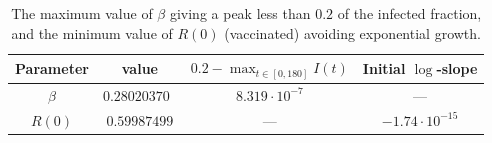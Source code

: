 \begin{table}[htb]
	\centering
	\caption{The maximum value of $\beta$ giving a peak less than $0.2$ of the infected fraction, and the minimum value of $R(0)$ (vaccinated) avoiding exponential growth.}
	\begin{tabular}{cccc}
		\toprule
		Parameter & value & $0.2 - \max_{t\in[0,180]} I(t)$ & Initial $\log$-slope \\
		\midrule
		$\beta$ & $0.28020370$ & $8.319\cdot 10^{-7}$ & --- \\
		$R(0)$  & $0.59987499$ & --- & $-1.74\cdot 10^{-15}$ \\
		\bottomrule
	\end{tabular}
	\label{tab:2Acd}
\end{table}


\clearpage

